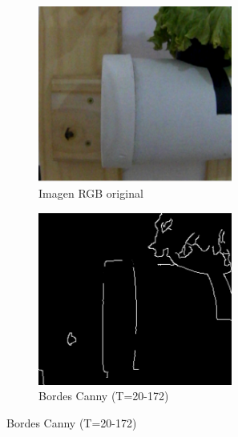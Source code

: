 \begin{figure}[H]
\centering
\begin{subfigure}[b]{0.48\textwidth}
    \centering
    \includegraphics[width=0.7\textwidth]{imagenes/detector_tubos_1_original.png}
    \caption{Imagen RGB original}
\end{subfigure}
\hfill
\begin{subfigure}[b]{0.48\textwidth}
    \centering
    \includegraphics[width=0.7\textwidth]{imagenes/detector_tubos_2_canny.png}
    \caption{Bordes Canny (T=20-172)}
\end{subfigure}

\vspace{0.3cm}


\end{figure}
